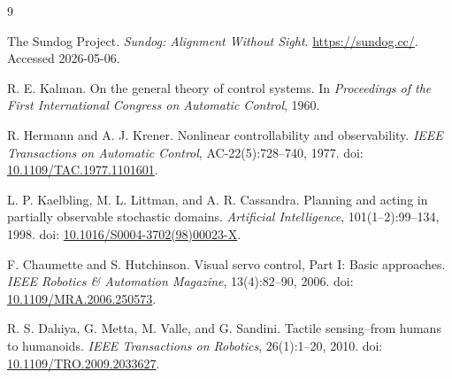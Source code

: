 \documentclass[11pt]{article}
\begin{document}
\begin{thebibliography}{9}

The Sundog Project.
\newblock \emph{Sundog: Alignment Without Sight}.
\newblock \url{https://sundog.cc/}. Accessed 2026-05-06.

R. E. Kalman.
\newblock On the general theory of control systems.
\newblock In \emph{Proceedings of the First International Congress on Automatic Control}, 1960.

R. Hermann and A. J. Krener.
\newblock Nonlinear controllability and observability.
\newblock \emph{IEEE Transactions on Automatic Control}, AC-22(5):728--740, 1977.
\newblock doi: \href{https://doi.org/10.1109/TAC.1977.1101601}{10.1109/TAC.1977.1101601}.

L. P. Kaelbling, M. L. Littman, and A. R. Cassandra.
\newblock Planning and acting in partially observable stochastic domains.
\newblock \emph{Artificial Intelligence}, 101(1--2):99--134, 1998.
\newblock doi: \href{https://doi.org/10.1016/S0004-3702(98)00023-X}{10.1016/S0004-3702(98)00023-X}.

F. Chaumette and S. Hutchinson.
\newblock Visual servo control, Part I: Basic approaches.
\newblock \emph{IEEE Robotics \& Automation Magazine}, 13(4):82--90, 2006.
\newblock doi: \href{https://doi.org/10.1109/MRA.2006.250573}{10.1109/MRA.2006.250573}.

R. S. Dahiya, G. Metta, M. Valle, and G. Sandini.
\newblock Tactile sensing--from humans to humanoids.
\newblock \emph{IEEE Transactions on Robotics}, 26(1):1--20, 2010.
\newblock doi: \href{https://doi.org/10.1109/TRO.2009.2033627}{10.1109/TRO.2009.2033627}.

\end{thebibliography}
\end{document}
